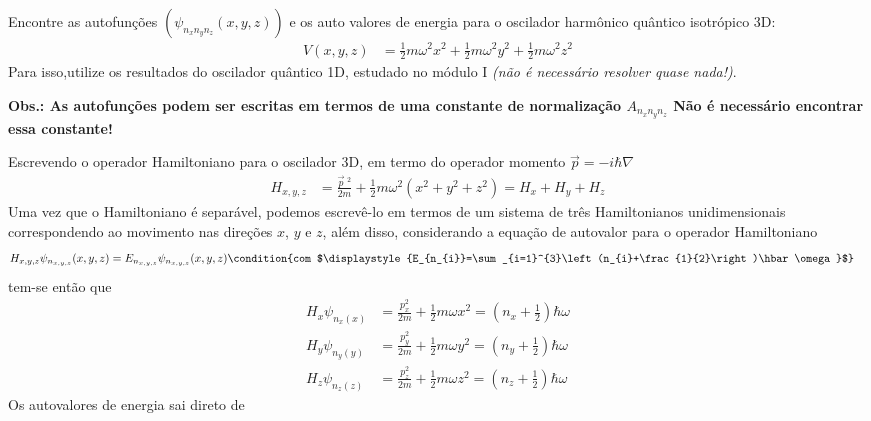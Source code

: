  \begin{prob}
	 Encontre as autofunções $(\psi_{n_{x}n_{y}n_{z}}(x,y,z))$ e os auto valores de energia para o oscilador harmônico quântico isotrópico 3D:
	 \begin{align}
		 V(x,y,z) &= \frac{1}{2}m \omega^{2}x^{2}+\frac{1}{2}m \omega^{2}y^{2}+\frac{1}{2}m \omega^{2}z^{2}
	 \end{align}
	 Para isso,utilize os resultados do oscilador quântico 1D, estudado no módulo I \textit{(não é necessário resolver quase nada!)}.

	 \noindent \textbf{Obs.: As autofunções podem ser escritas em termos de uma constante de normalização $A_{n_{x}n_{y}n_{z}}$ Não é necessário encontrar essa constante!}
	 \begin{sol}
		 Escrevendo o operador Hamiltoniano para o oscilador 3D, em termo do operador momento $\vec{p}=-i \hbar\nabla$
		 \begin{align}
			 H_{x,y,z} &= \frac{\vec{p}\;^{2}}{2m}+\frac{1}{2}m \omega^{2}\left(x^{2}+y^{2}+z^{2}\right) = H_{x}+H_{y}+H_{z}
		 \end{align}
		 Uma vez que o Hamiltoniano é separável, podemos escrevê-lo em termos de um sistema de três Hamiltonianos unidimensionais correspondendo ao movimento nas direções $x$, $y$ e $z$, além disso, considerando a equação de autovalor para o operador Hamiltoniano
		 \begin{align}
			 H_{x,y,z} \psi_{n_{x,y,z}}(x,y,z) &= E_{n_{x,y,z}} \psi_{n_{x,y,z}}(x,y,z)\condition{com $\displaystyle{E_{n_{i}}=\sum_{i=1}^{3}\left(n_{i}+\frac{1}{2}\right)\hbar \omega}$}
		 \end{align}
		 tem-se então que
		 \begin{subequations}
			 \begin{align}
				 H_{x} \psi_{n_{x}(x)} &= \frac{p_{x}^{2}}{2m}+\frac{1}{2}m \omega x^{2}=\left(n_{x}+\frac{1}{2}\right)\hbar \omega \label{eq:ohq-1}\\
				 H_{y} \psi_{n_{y}(y)} &= \frac{p_{y}^{2}}{2m}+\frac{1}{2}m \omega y^{2}=\left(n_{y}+\frac{1}{2}\right)\hbar \omega\label{eq:ohq-2}\\
				 H_{z} \psi_{n_{z}(z)} &= \frac{p_{z}^{2}}{2m}+\frac{1}{2}m \omega z^{2}=\left(n_{z}+\frac{1}{2}\right)\hbar \omega\label{eq:ohq-3}
			 \end{align}
		 \end{subequations}
		 Os autovalores de energia sai direto de

\end{sol}
\end{prob}
